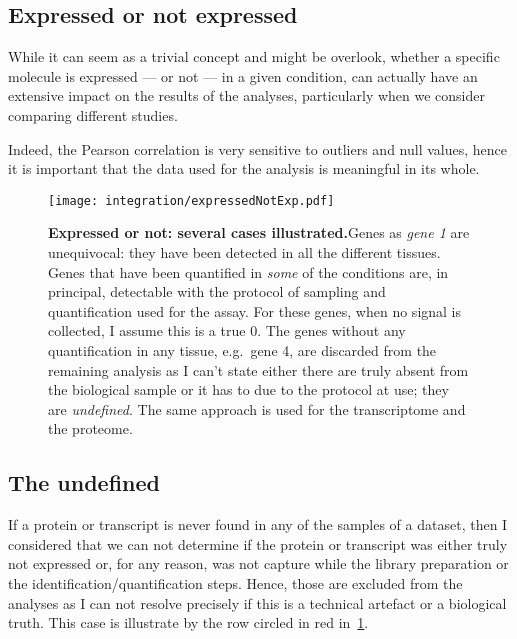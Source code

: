 \subsection{Expressed or not expressed}
\label{subsec:TransExpressedOrNot}
While it can seem as a trivial concept and might be overlook, whether a specific
molecule is expressed --- or not --- in a given condition, can actually have
an extensive impact on the results of the analyses, particularly when we consider
comparing different studies.

Indeed, the Pearson correlation is very sensitive to outliers and null values,
  hence it is important that the data used for the analysis is meaningful in
  its whole.

\begin{figure}[!htbp]
  \texttt{[image: integration/expressedNotExp.pdf]}\centering
      \caption[Expressed or not: several cases illustrated]
      {\label{fig:DefineExpression}\textbf{Expressed or not: several cases
      illustrated.}\smallbreak{}Genes as \emph{gene 1} are unequivocal: they have been
      detected in all the different tissues. Genes that have been quantified in
      \emph{some} of the conditions are, in principal, detectable with the
      protocol of sampling and quantification used for the assay.
      For these genes, when no signal is collected, I assume this is a true $0$.
      The genes without any quantification
      in any tissue, e.g.\ gene 4, are discarded from the remaining analysis as
      I can't state
      either there are truly absent from the biological sample or it has to due
      to the protocol at use; they are \emph{undefined}. The same approach is used
      for the transcriptome and the proteome.}
  \end{figure}


  \subsection{The undefined}
  \label{subsec:IntegrationExpressedOrNot-undefined}
  If a protein or transcript is never found in any of the samples of a dataset,
  then I considered that we can not determine if the protein or transcript was
  either truly not expressed or, for any reason, was not capture while the library
  preparation or the identification/quantification steps. Hence, those are
  excluded from the analyses as I can not resolve precisely if this is a
  technical artefact or a biological truth. This case is illustrate by the row
  circled in red in~\cref{fig:DefineExpression}.

